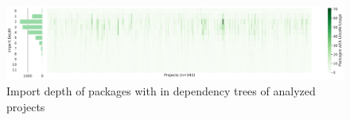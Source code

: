 \begin{figure}[htp!]
    \centering
    \includegraphics[width=\textwidth]{assets/plots/chapter4/unsafe-import-depth.pdf}
    \caption{Import depth of packages with \unsafe{} in dependency trees of analyzed projects}
    \label{fig:unsafe-import-depth}
\end{figure}
